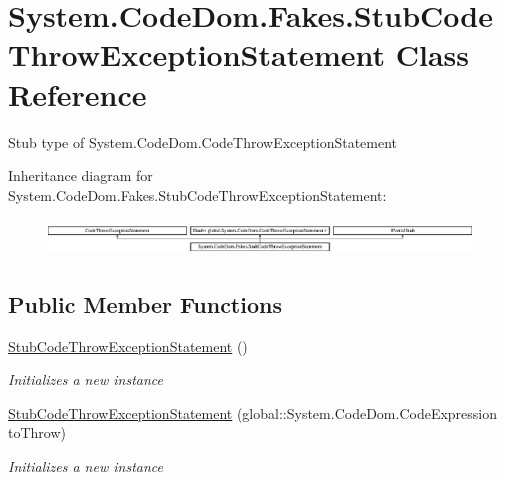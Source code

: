 \hypertarget{class_system_1_1_code_dom_1_1_fakes_1_1_stub_code_throw_exception_statement}{\section{System.\-Code\-Dom.\-Fakes.\-Stub\-Code\-Throw\-Exception\-Statement Class Reference}
\label{class_system_1_1_code_dom_1_1_fakes_1_1_stub_code_throw_exception_statement}
}


Stub type of System.\-Code\-Dom.\-Code\-Throw\-Exception\-Statement 


Inheritance diagram for System.\-Code\-Dom.\-Fakes.\-Stub\-Code\-Throw\-Exception\-Statement\-:\begin{figure}[H]
\begin{center}
\leavevmode
\includegraphics[height=0.964686cm]{class_system_1_1_code_dom_1_1_fakes_1_1_stub_code_throw_exception_statement}
\end{center}
\end{figure}
\subsection*{Public Member Functions}
\begin{DoxyCompactItemize}
\item 
\hyperlink{class_system_1_1_code_dom_1_1_fakes_1_1_stub_code_throw_exception_statement_ad64ff2b9a70767bf222edcac89fb6584}{Stub\-Code\-Throw\-Exception\-Statement} ()
\begin{DoxyCompactList}\small\item\em Initializes a new instance\end{DoxyCompactList}\item 
\hyperlink{class_system_1_1_code_dom_1_1_fakes_1_1_stub_code_throw_exception_statement_a607f7b5b6cba58205e55c2e7672669fb}{Stub\-Code\-Throw\-Exception\-Statement} (global\-::\-System.\-Code\-Dom.\-Code\-Expression to\-Throw)
\begin{DoxyCompactList}\small\item\em Initializes a new instance\end{DoxyCompactList}\end{DoxyCompactItemize}
